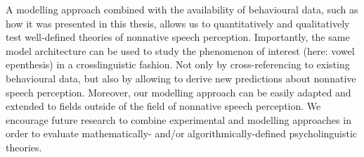A modelling approach combined with the availability of behavioural data, such as how it was presented in this thesis, allows us to quantitatively and qualitatively test well-defined theories of nonnative speech perception. Importantly, the same model architecture can be used to study the phenomenon of interest (here: vowel epenthesis) in a crosslinguistic fashion. Not only by cross-referencing to existing behavioural data, but also by allowing to derive new predictions about nonnative speech perception. Moreover, our modelling approach can be easily adapted and extended to fields outside of the field of nonnative speech perception. We encourage future research to combine experimental and modelling approaches in order to evaluate mathematically- and/or algorithmically-defined psycholinguistic theories. 
